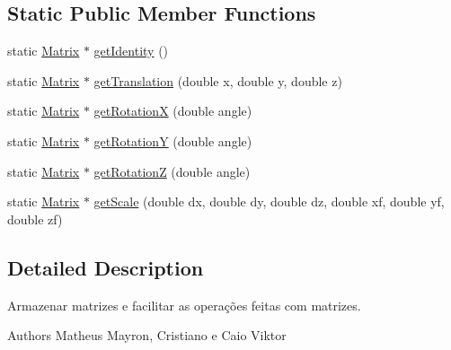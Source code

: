 \subsection*{Static Public Member Functions}
\begin{DoxyCompactItemize}
\item 
static \hyperlink{class_matrix}{Matrix} $\ast$ \hyperlink{class_matrix_a313fc02b3add94865e1ef93b65970bed}{get\-Identity} ()
\item 
static \hyperlink{class_matrix}{Matrix} $\ast$ \hyperlink{class_matrix_ab2660811c2f56c36000d43e6480c4ef7}{get\-Translation} (double x, double y, double z)
\item 
static \hyperlink{class_matrix}{Matrix} $\ast$ \hyperlink{class_matrix_abc824f1c958fd88b94b88f516e2b3166}{get\-Rotation\-X} (double angle)
\item 
static \hyperlink{class_matrix}{Matrix} $\ast$ \hyperlink{class_matrix_acb91d4483b1d3a06623b33171a449cda}{get\-Rotation\-Y} (double angle)
\item 
static \hyperlink{class_matrix}{Matrix} $\ast$ \hyperlink{class_matrix_a083befb3295d36151e474565e57ddf0e}{get\-Rotation\-Z} (double angle)
\item 
static \hyperlink{class_matrix}{Matrix} $\ast$ \hyperlink{class_matrix_a6da4076ea170794342881449f8495ec5}{get\-Scale} (double dx, double dy, double dz, double xf, double yf, double zf)
\end{DoxyCompactItemize}


\subsection{Detailed Description}
Armazenar matrizes e facilitar as operações feitas com matrizes. 

\begin{DoxyAuthor}{Authors}
Matheus Mayron, Cristiano e Caio Viktor 
\end{DoxyAuthor}


